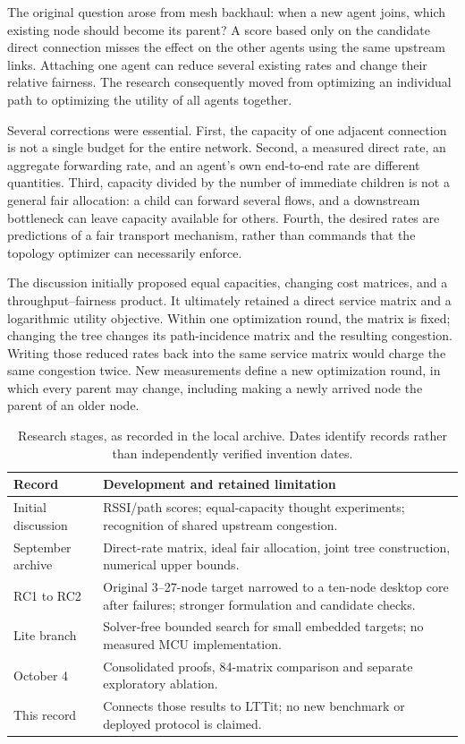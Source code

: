 \documentclass[conference,letterpaper]{IEEEtran}
\begin{document}
The original question arose from mesh backhaul: when a new agent joins, which existing node should become its parent? A score based only on the candidate direct connection misses the effect on the other agents using the same upstream links. Attaching one agent can reduce several existing rates and change their relative fairness. The research consequently moved from optimizing an individual path to optimizing the utility of all agents together.

Several corrections were essential. First, the capacity of one adjacent connection is not a single budget for the entire network. Second, a measured direct rate, an aggregate forwarding rate, and an agent's own end-to-end rate are different quantities. Third, capacity divided by the number of immediate children is not a general fair allocation: a child can forward several flows, and a downstream bottleneck can leave capacity available for others. Fourth, the desired rates are predictions of a fair transport mechanism, rather than commands that the topology optimizer can necessarily enforce.

The discussion initially proposed equal capacities, changing cost matrices, and a throughput--fairness product. It ultimately retained a direct service matrix and a logarithmic utility objective. Within one optimization round, the matrix is fixed; changing the tree changes its path-incidence matrix and the resulting congestion. Writing those reduced rates back into the same service matrix would charge the same congestion twice. New measurements define a new optimization round, in which every parent may change, including making a newly arrived node the parent of an older node.

\begin{table}[t]
\caption{Research stages, as recorded in the local archive. Dates identify records rather than independently verified invention dates.}
\label{tab:history}
\centering\small
\begin{tabular}{@{}>{\raggedright\arraybackslash}p{}>{\raggedright\arraybackslash}p{}@{}}
\toprule
Record & Development and retained limitation\\\midrule
Initial discussion & RSSI/path scores; equal-capacity thought experiments; recognition of shared upstream congestion.\\
September archive & Direct-rate matrix, ideal fair allocation, joint tree construction, numerical upper bounds.\\
RC1 to RC2 & Original 3--27-node target narrowed to a ten-node desktop core after failures; stronger formulation and candidate checks.\\
Lite branch & Solver-free bounded search for small embedded targets; no measured MCU implementation.\\
October 4 & Consolidated proofs, 84-matrix comparison and separate exploratory ablation.\\
This record & Connects those results to LTTit; no new benchmark or deployed protocol is claimed.\\\bottomrule
\end{tabular}
\end{table}
\end{document}
